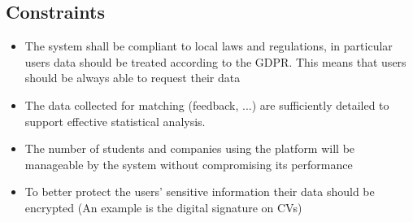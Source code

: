		\subsection{Constraints}
			\begin{itemize}
				\item The system shall be compliant to local laws and regulations, in particular users data should be treated
				according to the GDPR. This means that users should be always able to request their data
				\item The data collected for matching (feedback, ...) are sufficiently detailed to support effective statistical analysis.
				\item The number of students and companies using the platform will be manageable by the system without compromising its performance
				\item To better protect the users’ sensitive information their data should be encrypted (An example is the digital signature on CVs)
			\end{itemize}
		